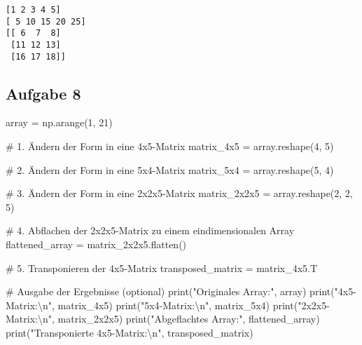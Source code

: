\documentclass[
  letterpaper,
  DIV=11,
  numbers=noendperiod]{scrreprt}
\newenvironment{Shaded}{\begin{snugshade}}{\end{snugshade}}
\newcommand{\BuiltInTok}[1]{\textcolor[rgb]{0.00,0.23,0.31}{#1}}
\newcommand{\CharTok}[1]{\textcolor[rgb]{0.13,0.47,0.30}{#1}}
\newcommand{\CommentTok}[1]{\textcolor[rgb]{0.37,0.37,0.37}{#1}}
\newcommand{\DecValTok}[1]{\textcolor[rgb]{0.68,0.00,0.00}{#1}}
\newcommand{\NormalTok}[1]{\textcolor[rgb]{0.00,0.23,0.31}{#1}}
\newcommand{\OperatorTok}[1]{\textcolor[rgb]{0.37,0.37,0.37}{#1}}
\newcommand{\StringTok}[1]{\textcolor[rgb]{0.13,0.47,0.30}{#1}}
\begin{document}
\begin{tcolorbox}
\begin{tcolorbox}
\begin{verbatim}
[1 2 3 4 5]
[ 5 10 15 20 25]
[[ 6  7  8]
 [11 12 13]
 [16 17 18]]
\end{verbatim}

\subsection*{Aufgabe 8}\label{aufgabe-8-1}

\begin{Shaded}
\begin{Highlighting}[]
\NormalTok{array }\OperatorTok{=}\NormalTok{ np.arange(}\DecValTok{1}\NormalTok{, }\DecValTok{21}\NormalTok{)}

\CommentTok{\# 1. Ändern der Form in eine 4x5{-}Matrix}
\NormalTok{matrix\_4x5 }\OperatorTok{=}\NormalTok{ array.reshape(}\DecValTok{4}\NormalTok{, }\DecValTok{5}\NormalTok{)}

\CommentTok{\# 2. Ändern der Form in eine 5x4{-}Matrix}
\NormalTok{matrix\_5x4 }\OperatorTok{=}\NormalTok{ array.reshape(}\DecValTok{5}\NormalTok{, }\DecValTok{4}\NormalTok{)}

\CommentTok{\# 3. Ändern der Form in eine 2x2x5{-}Matrix}
\NormalTok{matrix\_2x2x5 }\OperatorTok{=}\NormalTok{ array.reshape(}\DecValTok{2}\NormalTok{, }\DecValTok{2}\NormalTok{, }\DecValTok{5}\NormalTok{)}

\CommentTok{\# 4. Abflachen der 2x2x5{-}Matrix zu einem eindimensionalen Array}
\NormalTok{flattened\_array }\OperatorTok{=}\NormalTok{ matrix\_2x2x5.flatten()}

\CommentTok{\# 5. Transponieren der 4x5{-}Matrix}
\NormalTok{transposed\_matrix }\OperatorTok{=}\NormalTok{ matrix\_4x5.T}

\CommentTok{\# Ausgabe der Ergebnisse (optional)}
\BuiltInTok{print}\NormalTok{(}\StringTok{"Originales Array:"}\NormalTok{, array)}
\BuiltInTok{print}\NormalTok{(}\StringTok{"4x5{-}Matrix:}\CharTok{\textbackslash{}n}\StringTok{"}\NormalTok{, matrix\_4x5)}
\BuiltInTok{print}\NormalTok{(}\StringTok{"5x4{-}Matrix:}\CharTok{\textbackslash{}n}\StringTok{"}\NormalTok{, matrix\_5x4)}
\BuiltInTok{print}\NormalTok{(}\StringTok{"2x2x5{-}Matrix:}\CharTok{\textbackslash{}n}\StringTok{"}\NormalTok{, matrix\_2x2x5)}
\BuiltInTok{print}\NormalTok{(}\StringTok{"Abgeflachtes Array:"}\NormalTok{, flattened\_array)}
\BuiltInTok{print}\NormalTok{(}\StringTok{"Transponierte 4x5{-}Matrix:}\CharTok{\textbackslash{}n}\StringTok{"}\NormalTok{, transposed\_matrix)}
\end{Highlighting}
\end{Shaded}


\end{tcolorbox}
\end{tcolorbox}
\end{document}

